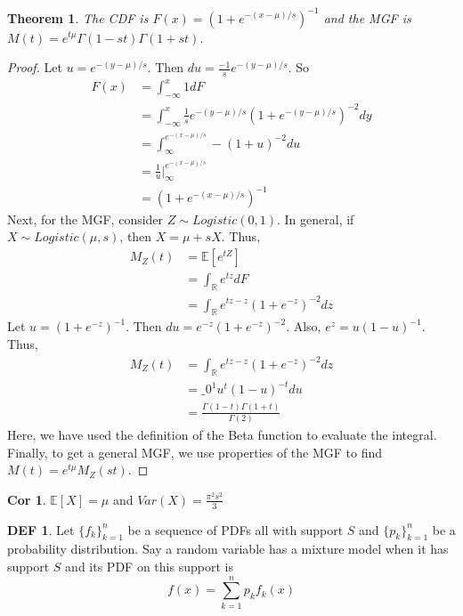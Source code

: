 \documentclass{article}
\newtheorem{theorem}{Theorem}
\theoremstyle{definition}\newtheorem{definition}{DEF}
\theoremstyle{definition}\newtheorem{example}{Ex}
\theoremstyle{lemma}\newtheorem{lemma}{Lemma}
\theoremstyle{corrolary}\newtheorem{corrolary}{Cor}
\begin{document}
\begin{theorem}
The CDF is $F(x)=(1+e^{-(x-\mu )/s})^{-1}$ and the MGF is $M(t)=e^{t\mu} \Gamma(1-st)\Gamma(1+st)$.
\end{theorem}
\begin{proof}
Let $u=e^{-(y-\mu)/s}$.
Then $du = \frac{-1}{s}e^{-(y-\mu)/s}$.
So
\begin{align*}
F(x)&=\int_{-\infty}^x 1dF \\
&= \int_{-\infty}^{x} \frac{1}{s}e^{-(y-\mu )/s} \left( 1+e^{-(y-\mu )/s}\right)^{-2} dy\\
&= \int_\infty^{e^{-(x-\mu)/s}} -(1+u)^{-2} du\\
&=\frac{1}{u}|_\infty^{e^{-(x-\mu)/s}}\\
&=\left( 1+e^{-(x-\mu)/s}\right)^{-1}
\end{align*}
Next, for the MGF, consider $Z\sim Logistic(0,1)$.
In general, if $X\sim Logistic(\mu, s)$, then $X=\mu +sX$.
Thus,
\begin{align*}
M_Z(t)&=\mathbb{E}[e^{tZ}]\\
&=\int_\mathbb{R} e^{tz} dF\\
&= \int_\mathbb{R} e^{tz-z} \left( 1+ e^{-z}\right)^{-2} dz
\end{align*}
Let $u=\left( 1+e^{-z}\right)^{-1}$.
Then $du=e^{-z}\left(1+e^{-z}\right)^{-2}$.
Also, $e^z=u(1-u)^{-1}$.
Thus,
\begin{align*}
M_Z(t)&=\int_\mathbb{R} e^{tz-z} \left( 1+ e^{-z}\right)^{-2} dz \\
&= \_0^1 u^t (1-u)^{-t} du\\
&=\frac{\Gamma (1-t)\Gamma(1+t)}{\Gamma(2)}
\end{align*}
Here, we have used the definition of the Beta function to evaluate the integral.
Finally, to get a general MGF, we use properties of the MGF to find $M(t)=e^{t\mu}M_Z(st)$.
\end{proof}
\begin{corrolary}
$\mathbb{E}[X]=\mu$ and $Var(X)=\frac{\pi^2 s^2}{3}$
\end{corrolary}

\begin{definition}
Let $\{f_k\}_{k=1}^n$ be a sequence of PDFs all with support $S$ and $\{p_k\}_{k=1}^n$ be a probability distribution.
Say a random variable has a mixture model when it has support $S$ and its PDF on this support is
\begin{equation}
f(x)=\sum_{k=1}^n p_k f_k (x)
\end{equation}
\end{definition}
\end{document}
